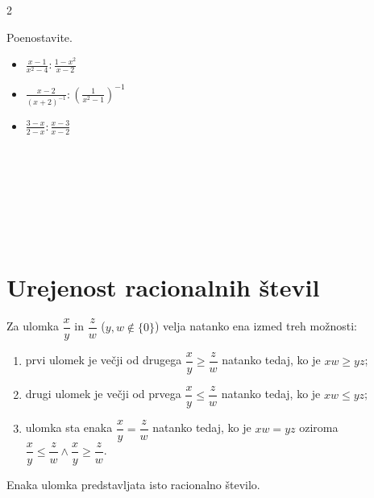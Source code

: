 \begin{multicols}{2}
        
            \begin{naloga}
                Poenostavite.
                \begin{itemize}
                    \item $\frac{x-1}{x^2-4}:\frac{1-x^2}{x-2}$ 
                    \item $\frac{x-2}{(x+2)^{-1}}:\left(\frac{1}{x^2-1}\right)^{-1}$ 
                    \item $\frac{3-x}{2-x}:\frac{x-3}{x-2}$ 
                \end{itemize}
            \end{naloga}

            ~\\~\\~\\~\\~\\~~\\

        \end{multicols}

\newpage

\section{Urejenost racionalnih števil}

            
    
                    Za ulomka $\dfrac{x}{y}$ in $\dfrac{z}{w}$ ($y,w\notin\{0\}$) velja natanko ena izmed treh možnosti:
                    
                    \begin{enumerate}
                        \item prvi ulomek je večji od drugega $\dfrac{x}{y}\geq\dfrac{z}{w}$ natanko tedaj, ko je $xw\geq yz$;
                        \item drugi ulomek je večji od prvega $\dfrac{x}{y}\leq\dfrac{z}{w}$ natanko tedaj, ko je $xw\leq yz$;
                        \item ulomka sta enaka $\dfrac{x}{y}=\dfrac{z}{w}$ natanko tedaj, ko je $xw=yz$ oziroma $\dfrac{x}{y}\leq\dfrac{z}{w} \land \dfrac{x}{y}\geq\dfrac{z}{w}$.
                    \end{enumerate}
    
    
                    Enaka ulomka predstavljata isto racionalno število.
    
                    ~


